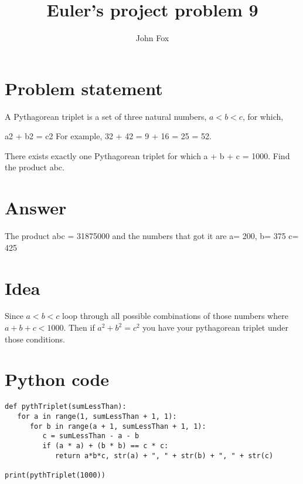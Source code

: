 \documentclass{article}
\title{Euler's project problem 9}
\author{John Fox}
\begin{document}
\maketitle

\section*{Problem statement} 
A Pythagorean triplet is a set of three natural numbers, $a < b < c$, for which,

a2 + b2 = c2
For example, 32 + 42 = 9 + 16 = 25 = 52.

There exists exactly one Pythagorean triplet for which a + b + c = 1000.
Find the product abc.

\section*{Answer}
The product abc = 31875000 and the numbers that got it are a= 200, b= 375 c= 425
\section*{Idea} Since $a < b < c$ loop through all possible combinations of those numbers where $a + b + c < 1000$. Then if $a^2 + b^2 = c^2$ you have your pythagorean triplet under those conditions. 

\section*{Python code}
\begin{verbatim}
def pythTriplet(sumLessThan):
   for a in range(1, sumLessThan + 1, 1):
      for b in range(a + 1, sumLessThan + 1, 1):
         c = sumLessThan - a - b 
         if (a * a) + (b * b) == c * c:
            return a*b*c, str(a) + ", " + str(b) + ", " + str(c)

print(pythTriplet(1000))
\end{verbatim}
\end{document}
